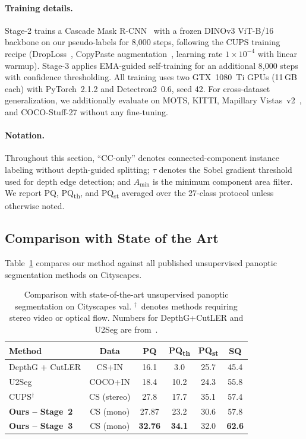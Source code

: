 \documentclass{bmvc2k}
\newcommand{\pqt}{PQ\textsubscript{th}\xspace}
\newcommand{\pqs}{PQ\textsubscript{st}\xspace}
\begin{document}
\paragraph{Training details.}
Stage-2 trains a Cascade Mask R-CNN~\cite{cai2021cascade} with a frozen DINOv3 ViT-B/16~\cite{fang2025dinov3} backbone on our pseudo-labels for 8{,}000 steps, following the CUPS training recipe (DropLoss~\cite{hahn2025cups}, CopyPaste augmentation~\cite{ghiasi2021copypaste}, learning rate $1{\times}10^{-4}$ with linear warmup). Stage-3 applies EMA-guided self-training for an additional 8{,}000 steps with confidence thresholding. All training uses two GTX~1080~Ti GPUs (11\,GB each) with PyTorch~2.1.2 and Detectron2~0.6, seed 42. For cross-dataset generalization, we additionally evaluate on MOTS, KITTI, Mapillary Vistas~v2~\cite{neuhold2017mapillary}, and COCO-Stuff-27 without any fine-tuning.

\paragraph{Notation.}
Throughout this section, ``CC-only'' denotes connected-component instance labeling without depth-guided splitting; $\tau$ denotes the Sobel gradient threshold used for depth edge detection; and $A_\text{min}$ is the minimum component area filter. We report PQ, \pqt, and \pqs averaged over the 27-class protocol unless otherwise noted.

\subsection{Comparison with State of the Art}

Table~\ref{tab:sota} compares our method against all published unsupervised panoptic segmentation methods on Cityscapes.

\begin{table}[t]
\centering
\caption{Comparison with state-of-the-art unsupervised panoptic segmentation on Cityscapes val. $^\dagger$~denotes methods requiring stereo video or optical flow. Numbers for DepthG+CutLER and U2Seg are from~\cite{hahn2025cups}.}
\label{tab:sota}
\small
\begin{tabular}{@{}lccccc@{}}
\toprule
Method & Data & PQ & \pqt & \pqs & SQ \\
\midrule
DepthG + CutLER & CS+IN & 16.1 & 3.0 & 25.7 & 45.4 \\
U2Seg~\cite{niu2024u2seg} & COCO+IN & 18.4 & 10.2 & 24.3 & 55.8 \\
CUPS$^\dagger$~\cite{hahn2025cups} & CS (stereo) & 27.8 & 17.7 & 35.1 & 57.4 \\
\midrule
\textbf{Ours -- Stage~2} & CS (mono) & 27.87 & 23.2 & 30.6 & 57.8 \\
\textbf{Ours -- Stage~3} & CS (mono) & \textbf{32.76} & \textbf{34.1} & 32.0 & \textbf{62.6} \\
\bottomrule
\end{tabular}
\end{table}
\end{document}
